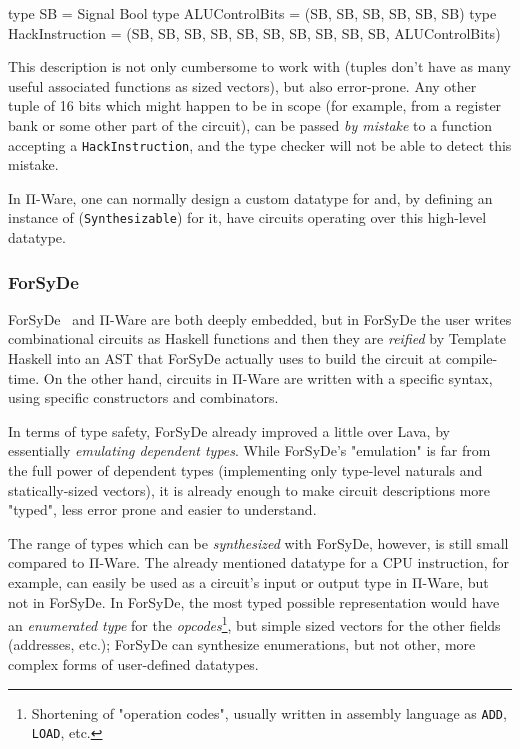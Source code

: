        \begin{haskellcode}
        type SB = Signal Bool
        type ALUControlBits = (SB, SB, SB, SB, SB, SB)
        type HackInstruction = (SB, SB, SB, SB, SB, SB, SB, SB, SB, SB, ALUControlBits)
        \end{haskellcode}

        This description is not only cumbersome to work with
        (tuples don't have as many useful associated functions as sized vectors),
        but also error-prone.
        Any other tuple of 16 bits which might happen to be in scope
        (for example, from a register bank or some other part of the circuit),
        can be passed \emph{by mistake} to a function accepting a \texttt{HackInstruction},
        and the type checker will not be able to detect this mistake.

        In Π-Ware, one can normally design a custom datatype for  and, by defining
        an instance of  (\texttt{Synthesizable}) for it, have circuits operating over this
        high-level datatype.

        \subsubsection{ForSyDe}

        ForSyDe~\cite{forsyde1999} and Π-Ware are both deeply embedded, but in ForSyDe the user
        writes combinational circuits as Haskell functions and then they are \emph{reified}
        by Template Haskell into an \ac{AST} that ForSyDe actually uses to build the circuit at compile-time.
        On the other hand, circuits in Π-Ware are written with a specific syntax, using specific constructors
        and combinators.

        In terms of type safety, ForSyDe already improved a little over Lava, by essentially
        \emph{emulating dependent types}.
        While ForSyDe's "emulation" is far from the full power of dependent types
        (implementing only type-level naturals and statically-sized vectors),
        it is already enough to make circuit descriptions more "typed", less error prone and
        easier to understand.

        The range of types which can be \emph{synthesized} with ForSyDe, however, is still small
        compared to Π-Ware. The already mentioned datatype for a CPU instruction, for example, can
        easily be used as a circuit's input or output type in Π-Ware, but not in ForSyDe.
        In ForSyDe, the most typed possible representation would have an \emph{enumerated type} for the
        \emph{opcodes}\footnote{Shortening of "operation codes",
            usually written in assembly language as \texttt{ADD}, \texttt{LOAD}, etc.},
        but simple sized vectors for the other fields (addresses, etc.);
        ForSyDe can synthesize enumerations, but not other, more complex forms of user-defined datatypes.

